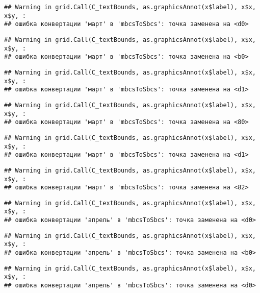 \documentclass[
]{article}
\begin{document}
\begin{verbatim}
## Warning in grid.Call(C_textBounds, as.graphicsAnnot(x$label), x$x, x$y, :
## ошибка конвертации 'март' в 'mbcsToSbcs': точка заменена на <d0>
\end{verbatim}

\begin{verbatim}
## Warning in grid.Call(C_textBounds, as.graphicsAnnot(x$label), x$x, x$y, :
## ошибка конвертации 'март' в 'mbcsToSbcs': точка заменена на <b0>
\end{verbatim}

\begin{verbatim}
## Warning in grid.Call(C_textBounds, as.graphicsAnnot(x$label), x$x, x$y, :
## ошибка конвертации 'март' в 'mbcsToSbcs': точка заменена на <d1>
\end{verbatim}

\begin{verbatim}
## Warning in grid.Call(C_textBounds, as.graphicsAnnot(x$label), x$x, x$y, :
## ошибка конвертации 'март' в 'mbcsToSbcs': точка заменена на <80>
\end{verbatim}

\begin{verbatim}
## Warning in grid.Call(C_textBounds, as.graphicsAnnot(x$label), x$x, x$y, :
## ошибка конвертации 'март' в 'mbcsToSbcs': точка заменена на <d1>
\end{verbatim}

\begin{verbatim}
## Warning in grid.Call(C_textBounds, as.graphicsAnnot(x$label), x$x, x$y, :
## ошибка конвертации 'март' в 'mbcsToSbcs': точка заменена на <82>
\end{verbatim}

\begin{verbatim}
## Warning in grid.Call(C_textBounds, as.graphicsAnnot(x$label), x$x, x$y, :
## ошибка конвертации 'апрель' в 'mbcsToSbcs': точка заменена на <d0>
\end{verbatim}

\begin{verbatim}
## Warning in grid.Call(C_textBounds, as.graphicsAnnot(x$label), x$x, x$y, :
## ошибка конвертации 'апрель' в 'mbcsToSbcs': точка заменена на <b0>
\end{verbatim}

\begin{verbatim}
## Warning in grid.Call(C_textBounds, as.graphicsAnnot(x$label), x$x, x$y, :
## ошибка конвертации 'апрель' в 'mbcsToSbcs': точка заменена на <d0>
\end{verbatim}
\end{document}
